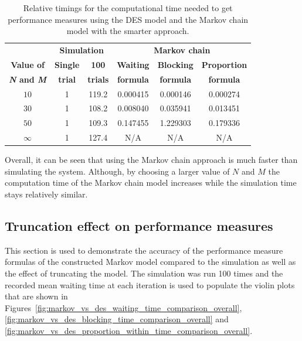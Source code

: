 \tiny
\begin{table}[H]
    \centering
    \caption{Relative timings for the computational time needed to get
    performance measures using the DES model and the Markov chain model with
    the smarter approach.}
    \begin{tabular}{c|cc|ccc}
        & \multicolumn{2}{c}{\textbf{Simulation}} &
        \multicolumn{3}{c}{\textbf{Markov chain}} \\
        \textbf{Value of} & \textbf{Single} & \textbf{100} &
        \textbf{Waiting} & \textbf{Blocking} &
        \textbf{Proportion} \\
        \textbf{\textit{N} and \textit{M}} & \textbf{trial} & \textbf{trials} &
        \textbf{formula} & \textbf{formula} & \textbf{formula} \\
        \hline
        \(10\) & 1 & 119.2 & 0.000415 & 0.000146 & 0.000274 \\
        \hline
        \(30\) & 1 & 108.2 & 0.008040 & 0.035941 & 0.013451 \\
        \hline
        \(50\) & 1 & 109.3 & 0.147455 & 1.229303 & 0.179336 \\
        \hline
        \(\infty\) & 1 & 127.4 & N/A & N/A & N/A \\
    \end{tabular}
    \label{tab:truncation_effect_timings_new}
\end{table}
\normalsize

Overall, it can be seen that using the Markov chain approach is much faster than
simulating the system.
Although, by choosing a larger value of \(N\) and \(M\) the computation time of
the Markov chain model increases while the simulation time stays relatively
similar.

\subsection{Truncation effect on performance measures}
\label{sec:truncation_effect_performance_measures}

This section is used to demonstrate the accuracy of the performance measure
formulas of the constructed Markov model compared to the simulation as well as
the effect of truncating the model.
The simulation was run 100 times and the recorded mean waiting time at each
iteration is used to populate the violin plots that are shown in
Figures~\ref{fig:markov_vs_des_waiting_time_comparison_overall},
\ref{fig:markov_vs_des_blocking_time_comparison_overall} and
\ref{fig:markov_vs_des_proportion_within_time_comparison_overall}.


